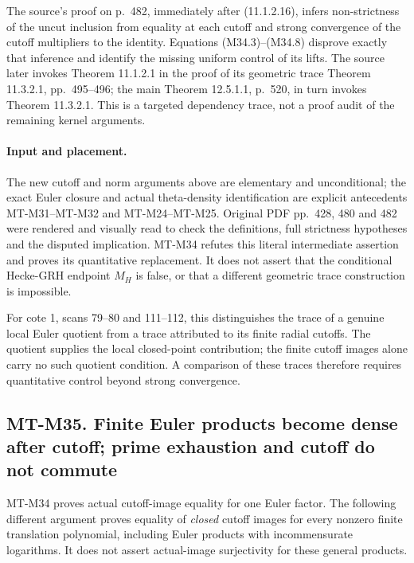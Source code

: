 The source's proof on p.~482, immediately after
(11.1.2.16), infers non-strictness of the uncut inclusion
from equality at each cutoff and strong convergence of
the cutoff multipliers to the identity.  Equations
(M34.3)--(M34.8) disprove exactly that inference and
identify the missing uniform control of its lifts.
The source later invokes Theorem 11.1.2.1 in the proof
of its geometric trace Theorem 11.3.2.1, pp.~495--496;
the main Theorem 12.5.1.1, p.~520, in turn invokes
Theorem 11.3.2.1.  This is a targeted dependency trace,
not a proof audit of the remaining kernel arguments.

\paragraph{Input and placement.}
The new cutoff and norm arguments above are elementary
and unconditional; the exact Euler closure and actual
theta-density identification are explicit antecedents
MT-M31--MT-M32 and MT-M24--MT-M25.  Original PDF
pp.~428, 480 and 482 were rendered and visually read
to check the definitions, full strictness hypotheses and
the disputed implication.  MT-M34 refutes this literal
intermediate assertion and proves its quantitative
replacement.  It does not assert that the conditional
Hecke-GRH endpoint $M_H$ is false, or that a different
geometric trace construction is impossible.

For cote 1, scans 79--80 and 111--112, this distinguishes
the trace of a genuine local Euler quotient from a
trace attributed to its finite radial cutoffs.  The
quotient supplies the local closed-point contribution;
the finite cutoff images alone carry no such quotient
condition.  A comparison of these traces therefore
requires quantitative control beyond strong convergence.

\subsection*{MT-M35. Finite Euler products become dense after cutoff;
prime exhaustion and cutoff do not commute}

MT-M34 proves actual cutoff-image equality for one Euler
factor.  The following different argument proves equality
of \emph{closed} cutoff images for every nonzero finite
translation polynomial, including Euler products with
incommensurate logarithms.  It does not assert actual-image
surjectivity for these general products.

